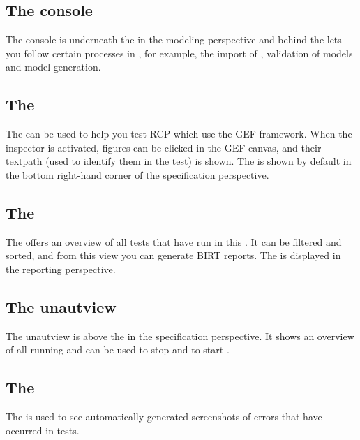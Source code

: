\subsection{The console}
The console is underneath the \gdmodeleditor{} in the modeling perspective and behind the \gdcompnamesview{} lets you follow certain processes in \app{}, for example, the import of \gdprojects{}, validation of models and model generation. 

\subsection{The \gdinspector{}}
The \gdinspector{} can be used to help you test RCP \gdauts{} which use the GEF framework. When the inspector is activated, figures can be clicked in the GEF canvas, and their textpath (used to identify them in the test) is shown. The \gdinspector{} is shown by default in the bottom right-hand corner of the specification perspective. 

\subsection{The \gdtestsummaryview{}}
The \gdtestsummaryview{} offers an overview of all tests that have run in this \gddb{}. It can be filtered and sorted, and from this view you can generate \app{} BIRT reports. The \gdtestsummaryview{} is displayed in the \app{} reporting perspective. 

\subsection{The \app{}unautview{}}
The \app{}unautview{} is above the \gdtestsuitebrowser{} in the specification perspective. It shows an overview of all running \gdauts{} and can be used to stop \gdauts{} and to start \gdsuites{}.  

\subsection{The \gdimgview{}}
The \gdimgview{} is used to see automatically generated screenshots of errors that have occurred in tests.
